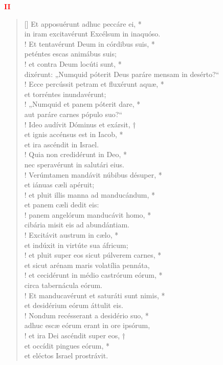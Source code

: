 \begin{center}
\textcolor{red}{\large \bf II}\\
\end{center}
\begin{verse}[\versewidth]
Et apposuérunt adhuc peccáre ei, *\\
in iram excitavérunt Excélsum in inaquóso.\\!
\vin Et tentavérunt Deum in córdibus suis, *\\
\vin peténtes escas animábus suis;\\!
et contra Deum locúti sunt, *\\
dixérunt: „Numquid \verselinebreak póterit Deus paráre mensam in desérto?“\\!
\vin Ecce percússit petram et fluxérunt aquæ, *\\
\vin et torréntes inundavérunt;\\!
„Numquid et panem póterit dare, *\\
aut paráre carnes pópulo suo?“\\!
\vin Ideo audívit Dóminus et exársit, †\\
\vin et ignis accénsus est in Iacob, *\\
\vin et ira ascéndit in Israel.\\!
Quia non credidérunt in Deo, *\\
nec speravérunt in salutári eius.\\!
\vin Verúmtamen mandávit núbibus désuper, *\\
\vin et iánuas cæli apéruit;\\!
et pluit illis manna ad manducándum, *\\
et panem cæli dedit eis:\\!
\vin panem angelórum manducávit homo, *\\
\vin cibária misit eis ad abundántiam.\\!
Excitávit austrum in cælo, *\\
et indúxit in virtúte sua áfricum;\\!
\vin et pluit super eos sicut púlverem carnes, *\\
\vin et sicut arénam maris volatília pennáta,\\!
et cecidérunt in médio castrórum eórum, *\\
circa tabernácula eórum.\\!
\vin Et manducavérunt et saturáti sunt nimis, *\\
\vin et desidérium eórum áttulit eis.\\!
Nondum recésserant a desidério suo, *\\
adhuc escæ eórum erant in ore ipsórum,\\!
\vin et ira Dei ascéndit super eos, †\\
\vin et occídit pingues eórum, *\\
\vin et eléctos Israel prostrávit.\\
\end{verse}

